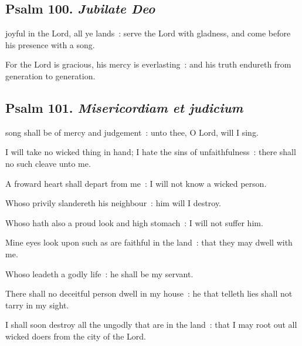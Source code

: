 \subsection{Psalm 100. \textit{Jubilate Deo}}

 joyful in the Lord, all ye lands~: serve the Lord with gladness, and come before his presence with a song.\par
{}
For the Lord is gracious, his mercy is everlasting~: and his truth endureth from generation to generation.\par

\clearpage
\subsection{Psalm 101. \textit{Misericordiam et judicium}}

 song shall be of mercy and judgement~: unto thee, O Lord, will I sing.\par
{}
I will take no wicked thing in hand; I hate the sins of unfaithfulness~: there shall no such cleave unto me.\par
{}A froward heart shall depart from me~: I will not know a wicked person.\par
{}Whoso privily slandereth his neighbour~: him will I destroy.\par
{}Whoso hath also a proud look and high stomach~: I will not suffer him.\par
{}Mine eyes look upon such as are faithful in the land~: that they may dwell with me.\par
{}Whoso leadeth a godly life~: he shall be my servant.\par
{}There shall no deceitful person dwell in my house~: he that telleth lies shall not tarry in my sight.\par
{}I shall soon destroy all the ungodly that are in the land~: that I may root out all wicked doers from the city of the Lord.\par


